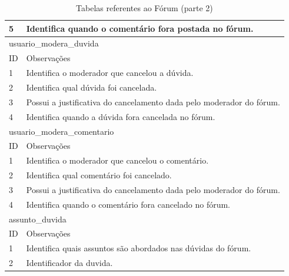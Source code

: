 \documentclass[graduacao,brazil]{ThesisPUC}
\begin{document}
\begin{table}[H]
{\begin{tabular}{|l|l|}
    5                         & Identifica quando o comentário fora postada no fórum.                                      \\ \hline
    \multicolumn{2}{|l|}{usuario\_modera\_duvida} \\ \hline
    ID                        & Observações                                                                                \\ \hline
    1                         & Identifica o moderador que cancelou a dúvida.                                              \\ \hline
    2                         & Identifica qual dúvida foi cancelada.                                                      \\ \hline
    3                         & Possui a justificativa do cancelamento dada pelo moderador do fórum.                       \\ \hline
    4                         & Identifica quando a dúvida fora cancelada no fórum.                                        \\ \hline
    \multicolumn{2}{|l|}{usuario\_modera\_comentario} \\ \hline
    ID                        & Observações                                                                                \\ \hline
    1                         & Identifica o moderador que cancelou o comentário.                                          \\ \hline
    2                         & Identifica qual comentário foi cancelado.                                                  \\ \hline
    3                         & Possui a justificativa do cancelamento dada pelo moderador do fórum.                       \\ \hline
    4                         & Identifica quando o comentário fora cancelado no fórum.                                    \\ \hline
    \multicolumn{2}{|l|}{assunto\_duvida} \\ \hline
    ID                        & Observações                                                                                \\ \hline
    1                         & Identifica quais assuntos são abordados nas dúvidas do fórum.                              \\ \hline
    2                         & Identificador da duvida.                                                                   \\ \hline
    \end{tabular}
    }
    \caption {Tabelas referentes ao F\'{o}rum (parte 2)}
\end{table}
\end{document}
